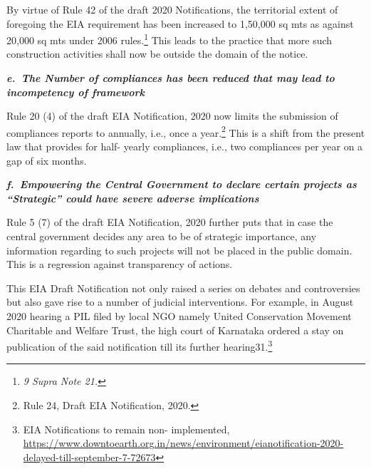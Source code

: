 \begin{multicols}{2}
\noi
By virtue of Rule 42 of the draft 2020 Notifications, the territorial extent of foregoing the
EIA requirement has been increased to 1,50,000 sq mts as against 20,000 sq mts under 2006
rules.\footnote{\textit{9 Supra Note 21.}} This leads to the practice that more such construction activities shall now be outside
the domain of the notice.

\vspace{-.02cm}
\noi
{\large\it\bfseries e.~The Number of compliances has been reduced that may lead to incompetency of framework }

\vspace{-.05cm}

\noi
Rule 20 (4) of the draft EIA Notification, 2020 now limits the submission of compliances
reports to annually, i.e., once a year.\footnote{Rule 24, Draft EIA Notification, 2020.} This is a shift from the present law that provides for
half- yearly compliances, i.e., two compliances per year on a gap of six months. 

\vspace{-.02cm}
\noi
{\large\it\bfseries f.~Empowering the Central Government to declare certain projects as “Strategic” could have severe adverse implications}

\vspace{-.05cm}

\noi
Rule 5 (7) of the draft EIA Notification, 2020 further puts that in case the central government
decides any area to be of strategic importance, any information regarding to such projects
will not be placed in the public domain. This is a regression against transparency of actions.


\vspace{-.1cm}

\noi
This EIA Draft Notification not only raised a series on debates and controversies but also
gave rise to a number of judicial interventions. For example, in August 2020 hearing a PIL
filed by local NGO namely United Conservation Movement Charitable and Welfare Trust,
the high court of Karnataka ordered a stay on publication of the said notification till its
further hearing31.\footnote{EIA Notifications to remain non- implemented, \url{https://www.downtoearth.org.in/news/environment/eianotification-2020-delayed-till-september-7-72673}}

\vspace{-.1cm}


\end{multicols}

